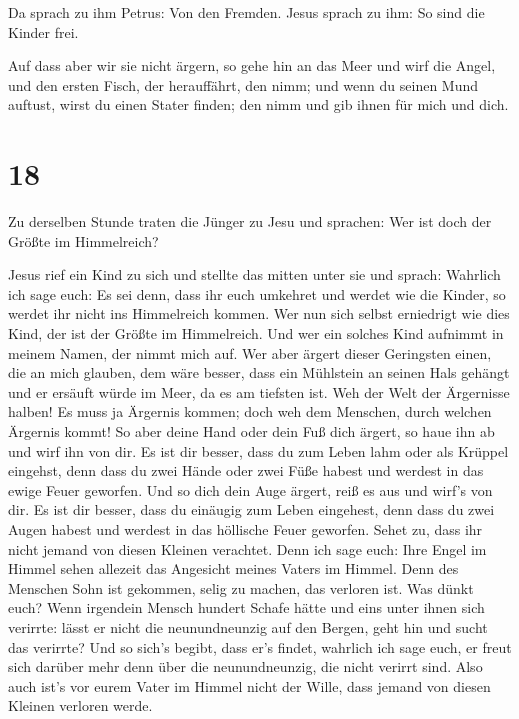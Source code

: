  Da sprach zu ihm Petrus: Von den Fremden. Jesus sprach
zu ihm: So sind die Kinder frei.

 Auf dass aber wir sie nicht ärgern, so gehe hin an das
Meer und wirf die Angel, und den ersten Fisch, der herauffährt, den
nimm; und wenn du seinen Mund auftust, wirst du einen Stater finden; den
nimm und gib ihnen für mich und dich.

\hypertarget{section-17}{%
\section{18}\label{section-17}}

 Zu derselben Stunde traten die Jünger zu Jesu und
sprachen: Wer ist doch der Größte im Himmelreich?

 Jesus rief ein Kind zu sich und stellte das mitten unter
sie  und sprach: Wahrlich ich sage euch: Es sei denn, dass
ihr euch umkehret und werdet wie die Kinder, so werdet ihr nicht ins
Himmelreich kommen.  Wer nun sich selbst erniedrigt wie
dies Kind, der ist der Größte im Himmelreich.  Und wer ein
solches Kind aufnimmt in meinem Namen, der nimmt mich auf.
 Wer aber ärgert dieser Geringsten einen, die an mich
glauben, dem wäre besser, dass ein Mühlstein an seinen Hals gehängt und
er ersäuft würde im Meer, da es am tiefsten ist.  Weh der
Welt der Ärgernisse halben! Es muss ja Ärgernis kommen; doch weh dem
Menschen, durch welchen Ärgernis kommt!  So aber deine
Hand oder dein Fuß dich ärgert, so haue ihn ab und wirf ihn von dir. Es
ist dir besser, dass du zum Leben lahm oder als Krüppel eingehst, denn
dass du zwei Hände oder zwei Füße habest und werdest in das ewige Feuer
geworfen.  Und so dich dein Auge ärgert, reiß es aus und
wirf's von dir. Es ist dir besser, dass du einäugig zum Leben eingehest,
denn dass du zwei Augen habest und werdest in das höllische Feuer
geworfen.  Sehet zu, dass ihr nicht jemand von diesen
Kleinen verachtet. Denn ich sage euch: Ihre Engel im Himmel sehen
allezeit das Angesicht meines Vaters im Himmel.  Denn des
Menschen Sohn ist gekommen, selig zu machen, das verloren ist.
 Was dünkt euch? Wenn irgendein Mensch hundert Schafe
hätte und eins unter ihnen sich verirrte: lässt er nicht die
neunundneunzig auf den Bergen, geht hin und sucht das verirrte?
 Und so sich's begibt, dass er's findet, wahrlich ich
sage euch, er freut sich darüber mehr denn über die neunundneunzig, die
nicht verirrt sind.  Also auch ist's vor eurem Vater im
Himmel nicht der Wille, dass jemand von diesen Kleinen verloren werde.

